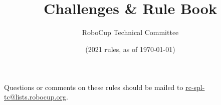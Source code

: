 \documentclass[12pt]{article}
\title{\leaguename\\
Challenges \& Rule Book}
\author{RoboCup Technical Committee}
\date{(2021 rules, as of \today)}
\begin{document}
  \maketitle

  \begin{center}
  Questions or comments on these rules should be mailed to \url{rc-spl-tc@lists.robocup.org}.
  \end{center}

  \newpage

  \setcounter{tocdepth}{4}
  \setcounter{secnumdepth}{4}
  \tableofcontents

  \thispagestyle{fancy}

  \clearpage

  \cfoot{\thepage}
  \setcounter{page}{1}

  \newpage

  
  \newpage
  
  \newpage
  
  \newpage
  
  \newpage
  
  \newpage
  
\end{document}
